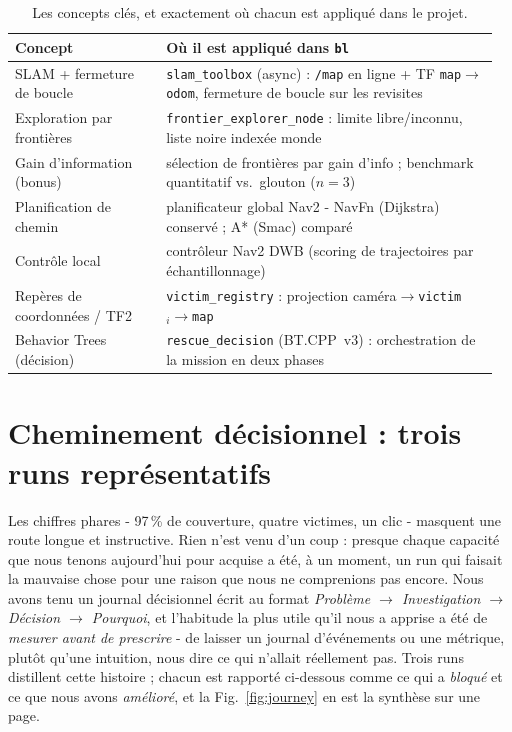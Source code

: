 \documentclass[11pt,a4paper]{article}
\begin{document}
\begin{table}[htbp]\centering\footnotesize
\begin{tabular}{@{}p{0.30\linewidth}p{0.66\linewidth}@{}}
\toprule
\textbf{Concept} & \textbf{Où il est appliqué dans \texttt{bl}}\\
\midrule
SLAM + fermeture de boucle & \texttt{slam\_toolbox} (async) : \texttt{/map} en ligne + TF \texttt{map}$\to$\texttt{odom}, fermeture de boucle sur les revisites\\
Exploration par frontières & \texttt{frontier\_explorer\_node} : limite libre/inconnu, liste noire indexée monde\\
Gain d'information (bonus) & sélection de frontières par gain d'info ; benchmark quantitatif vs.\ glouton ($n{=}3$)\\
Planification de chemin & planificateur global Nav2 - NavFn (Dijkstra) conservé ; A* (Smac) comparé\\
Contrôle local & contrôleur Nav2 DWB (scoring de trajectoires par échantillonnage)\\
Repères de coordonnées / TF2 & \texttt{victim\_registry} : projection caméra$\to$\texttt{victim}$_i\to$\texttt{map}\\
Behavior Trees (décision) & \texttt{rescue\_decision} (BT.CPP~v3) : orchestration de la mission en deux phases\\
\bottomrule
\end{tabular}
\caption{Les concepts clés, et exactement où chacun est appliqué dans le projet.}
\label{tab:concepts}
\end{table}

\section{Cheminement décisionnel : trois runs représentatifs}
Les chiffres phares - 97\,\% de couverture, quatre victimes, un clic - masquent une route longue et
instructive. Rien n'est venu d'un coup : presque chaque capacité que nous tenons aujourd'hui pour acquise
a été, à un moment, un run qui faisait la mauvaise chose pour une raison que nous ne comprenions pas
encore. Nous avons tenu un journal décisionnel écrit au format \emph{Problème $\to$ Investigation $\to$
Décision $\to$ Pourquoi}, et l'habitude la plus utile qu'il nous a apprise a été de \emph{mesurer avant
de prescrire} - de laisser un journal d'événements ou une métrique, plutôt qu'une intuition, nous dire ce
qui n'allait réellement pas. Trois runs distillent cette histoire ; chacun est rapporté ci-dessous comme
ce qui a \emph{bloqué} et ce que nous avons \emph{amélioré}, et la Fig.~\ref{fig:journey} en est la
synthèse sur une page.
\end{document}
